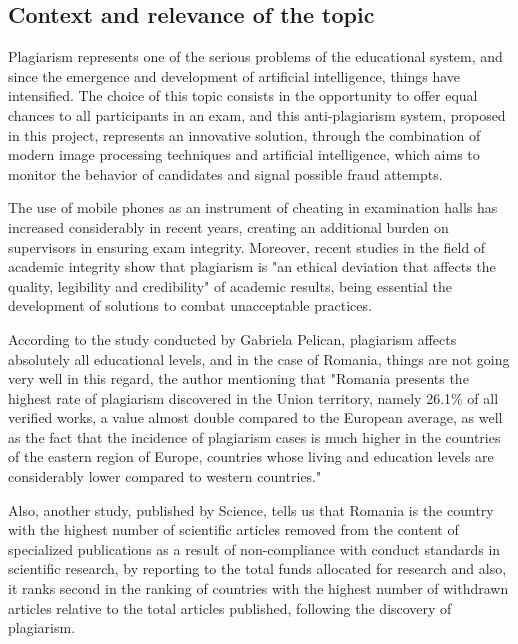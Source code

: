 \documentclass[12pt,a4paper]{article}
\begin{document}
\subsection{Context and relevance of the topic}

Plagiarism represents one of the serious problems of the educational system, and since the emergence and development of artificial intelligence, things have intensified. The choice of this topic consists in the opportunity to offer equal chances to all participants in an exam, and this anti-plagiarism system, proposed in this project, represents an innovative solution, through the combination of modern image processing techniques and artificial intelligence\cite{russell2020artificial}, which aims to monitor the behavior of candidates and signal possible fraud attempts.

The use of mobile phones as an instrument of cheating in examination halls has increased
considerably in recent years, creating an additional burden on supervisors in ensuring
exam integrity\cite{nazari2019detection}. Moreover, recent studies in the field of academic integrity show that plagiarism is "an ethical deviation that affects the quality, legibility and
credibility" of academic results, being essential the development of solutions to combat
unacceptable practices\cite{zimba2021plagiarism}.

According to the study conducted by Gabriela Pelican\cite{pelican2021plagiat}, plagiarism
affects absolutely all educational levels, and in the case of
Romania, things are not going very well in this regard, the author
mentioning that "Romania presents the highest rate of plagiarism
discovered in the Union territory, namely 26.1\% of all
verified works, a value almost double compared to the European
average, as well as the fact that the incidence of plagiarism cases is
much higher in the countries of the eastern region of Europe, countries whose
living and education levels are considerably lower
compared to western countries."

Also, another study\cite{brainard2018massive}, published by Science, tells us that Romania is the country with the highest number of
scientific articles removed from the content of specialized publications as
a result of non-compliance with conduct standards in scientific research,
by reporting to the total funds allocated for research and
also, it ranks second in the ranking of countries with the highest number of
withdrawn articles relative to the total articles published, following
the discovery of plagiarism.
\end{document}
